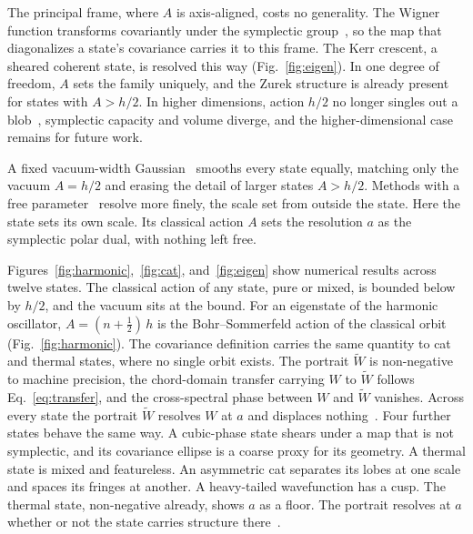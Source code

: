 \documentclass[aps,prl,reprint,amsmath,amssymb,floatfix,nofootinbib]{revtex4-2}
\begin{document}
The principal frame, where $A$ is axis-aligned, costs no generality. The Wigner function transforms covariantly under the symplectic group~\cite{cordero2018}, so the map that diagonalizes a state's covariance carries it to this frame. The Kerr crescent, a sheared coherent state, is resolved this way (Fig.~\ref{fig:eigen}). In one degree of freedom, $A$ sets the family uniquely, and the Zurek structure is already present for states with $A > h/2$. In higher dimensions, action $h/2$ no longer singles out a blob~\cite{degosson2013qblobs}, symplectic capacity and volume diverge, and the higher-dimensional case remains for future work.

A fixed vacuum-width Gaussian~\cite{husimi1940} smooths every state equally, matching only the vacuum $A = h/2$ and erasing the detail of larger states $A > h/2$. Methods with a free parameter~\cite{wodkiewicz1984,appleby1998husimi,cahillglauber1969} resolve more finely, the scale set from outside the state. Here the state sets its own scale. Its classical action $A$ sets the resolution $a$ as the symplectic polar dual, with nothing left free.

Figures~\ref{fig:harmonic},~\ref{fig:cat}, and~\ref{fig:eigen} show numerical results across twelve states. The classical action of any state, pure or mixed, is bounded below by $h/2$, and the vacuum sits at the bound. For an eigenstate of the harmonic oscillator, $A = (n+\tfrac12)\,h$ is the Bohr--Sommerfeld action of the classical orbit (Fig.~\ref{fig:harmonic}). The covariance definition carries the same quantity to cat and thermal states, where no single orbit exists. The portrait $\widetilde W$ is non-negative to machine precision, the chord-domain transfer carrying $W$ to $\widetilde W$ follows Eq.~\eqref{eq:transfer}, and the cross-spectral phase between $W$ and $\widetilde W$ vanishes. Across every state the portrait $\widetilde W$ resolves $W$ at $a$ and displaces nothing~\cite{zenododeposit}. Four further states behave the same way. A cubic-phase state shears under a map that is not symplectic, and its covariance ellipse is a coarse proxy for its geometry. A thermal state is mixed and featureless. An asymmetric cat separates its lobes at one scale and spaces its fringes at another. A heavy-tailed wavefunction has a cusp. The thermal state, non-negative already, shows $a$ as a floor. The portrait resolves at $a$ whether or not the state carries structure there~\cite{zenododeposit}.
\end{document}
